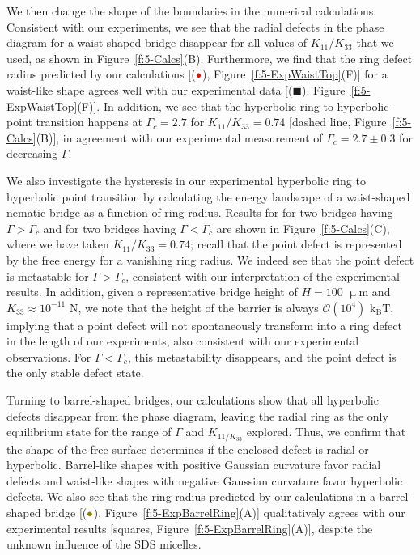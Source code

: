 We then change the shape of the boundaries in the numerical calculations.
Consistent with our experiments, we see that the radial defects in the phase diagram for a waist-shaped bridge disappear for all values of $K_{11}/K_{33}$ that we used, as shown in Figure~\ref{f:5-Calcs}(B).
Furthermore, we find that the ring defect radius predicted by our calculations [(${\color{red} \bullet}$), Figure~\ref{f:5-ExpWaistTop}(F)] for a waist-like shape agrees well with our experimental data [($\blacksquare$), Figure~\ref{f:5-ExpWaistTop}(F)].
In addition, we see that the hyperbolic-ring to hyperbolic-point transition happens at $\Gamma_c = 2.7$ for $K_{11}/K_{33} = 0.74$ [dashed line, Figure~\ref{f:5-Calcs}(B)], in agreement with our experimental measurement of $\Gamma_c = 2.7 \pm 0.3$ for decreasing $\Gamma$.

We also investigate the hysteresis in our experimental hyperbolic ring to hyperbolic point transition by calculating the energy landscape of a waist-shaped nematic bridge as a function of ring radius.
Results for for two bridges having $\Gamma > \Gamma_c$ and for two bridges having $\Gamma < \Gamma_c$ are shown in Figure~\ref{f:5-Calcs}(C), where we have taken $K_{11}/K_{33} = 0.74$; recall that the point defect is represented by the free energy for a vanishing ring radius.
We indeed see that the point defect is metastable for $\Gamma > \Gamma_c$, consistent with our interpretation of the experimental results.
In addition, given a representative bridge height of $H = 100$ $\upmu$m and $K_{33} \approx 10^{-11}$ N, we note that the height of the barrier is always $\mathcal{O} \left ( 10^{4} \right )$ k$_\textrm{B}$T, implying that a point defect will not spontaneously transform into a ring defect in the length of our experiments, also consistent with our experimental observations.
For $\Gamma < \Gamma_c$, this metastability disappears, and the point defect is the only stable defect state.

Turning to barrel-shaped bridges, our calculations show that all hyperbolic defects disappear from the phase diagram, leaving the radial ring as the only equilibrium state for the range of $\Gamma$ and $K_{11/K_{33}}$ explored.
Thus, we confirm that the shape of the free-surface determines if the enclosed defect is radial or hyperbolic.
Barrel-like shapes with positive Gaussian curvature favor radial defects and waist-like shapes with negative Gaussian curvature favor hyperbolic defects.
We also see that the ring radius predicted by our calculations in a barrel-shaped bridge [(${\color{olive} \bullet}$), Figure~\ref{f:5-ExpBarrelRing}(A)] qualitatively agrees with our experimental results [squares, Figure~\ref{f:5-ExpBarrelRing}(A)], despite the unknown influence of the SDS micelles.




